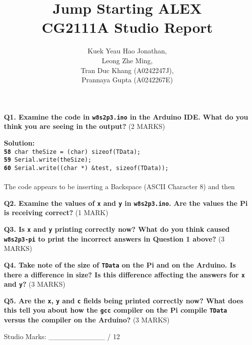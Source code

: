 \documentclass[a4paper,12pt,oneside, tikz]{book}
\title{\Huge\textbf{Jump Starting ALEX} \\ \Large{CG2111A Studio Report}}
\author{
Kuek Yeau Hao Jonathan, \\
Leong Zhe Ming, \\
Tran Duc Khang (A0242247J), \\ 
Prannaya Gupta (A0242267E)
}
\begin{document}
\maketitle

\newpage

\textbf{Q1. Examine the code in \texttt{w8s2p3.ino} in the Arduino IDE. What do you think you are seeing in the output?} (2 MARKS)

\begin{tcolorbox}
\textbf{Solution:}\\
\texttt{\textbf{58}    char theSize = (char) sizeof(TData); \\
\textbf{59}    Serial.write(theSize); \\
\textbf{60}    Serial.write((char *) &test, sizeof(TData));} \\

\\

The code appears to be inserting a Backspace (ASCII Character 8) and then 
\end{tcolorbox}

\textbf{Q2. Examine the values of \texttt{x} and \texttt{y} in \texttt{w8s2p3.ino}. Are the values the Pi is receiving correct?} (1 MARK)

\begin{tcolorbox}

\end{tcolorbox}

\textbf{Q3. Is \texttt{x} and \texttt{y} printing correctly now? What do you think caused \texttt{w8s2p3-pi} to print the incorrect answers in Question 1 above?} (3 MARKS)

\begin{tcolorbox}

\end{tcolorbox}

\textbf{Q4. Take note of the size of \texttt{TData} on the Pi and on the Arduino. Is there a difference in size? Is this difference affecting the answers for \texttt{x} and \texttt{y}?} (3 MARKS)

\begin{tcolorbox}

\end{tcolorbox}

\textbf{Q5. Are the \texttt{x}, \texttt{y} and \texttt{c} fields being printed correctly now? What does this tell you about how the \texttt{gcc} compiler on the Pi compile \texttt{TData} versus the compiler on the Arduino?} (3 MARKS)

\begin{tcolorbox}

\end{tcolorbox}

\vfill
\begin{ino}

Studio Marks: ___________ / 12
\end{ino}
\end{document}
